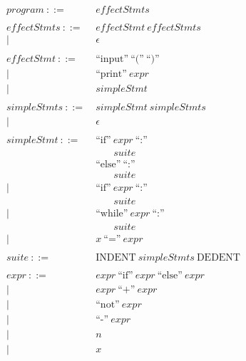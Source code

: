 \documentclass[sigplan, review]{acmart}
\begin{document}
\begin{align*}
program         \ ::=&\ ef\!f\!ectStmts\\\\
ef\!f\!ectStmts \ ::=&\ ef\!f\!ectStmt\ ef\!f\!ectStmts \\
                    |&\ \epsilon \\\\
ef\!f\!ectStmt  \ ::=&\ \text{``input''}\ \text{``(''}\ \text{``)''}\\
                    |&\ \text{``print''}\ expr\\
                    |&\ simpleStmt\\\\
simpleStmts     \ ::=&\ simpleStmt\ simpleStmts \\
                    |&\ \epsilon \\\\
simpleStmt      \ ::=&\ \text{``if''}\ expr\ \text{``:''}\\
                     &\qquad suite\\
                     &\ \text{``else''}\ \text{``:''}\\
                     &\qquad suite\\
                    |&\ \text{``if''}\ expr\ \text{``:''}\\
                     &\qquad suite\\
                    |&\ \text{``while''}\ expr\ \text{``:''}\\\
                     &\qquad suite\\
                    |&\ x\ \text{``=''}\ expr\\\\
suite           \ ::=&\ \text{INDENT}\ simpleStmts\ \text{DEDENT}\\\\
expr            \ ::=&\ expr\ \text{``if''}\ expr\ \text{``else''}\ expr\\
                    |&\ expr\ \text{``+''}\ expr\\
                    |&\ \text{``not''}\ expr\\
                    |&\ \text{``-''}\ expr\\
                    |&\ n\\
                    |&\ x
\end{align*}

\begingroup\vspace*{-\baselineskip}
\vspace*{\baselineskip}\endgroup
\end{document}
